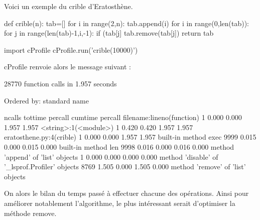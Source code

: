 \documentclass[11pt,oneside]{article}
\begin{document}
\begin{exemple}

Voici un exemple du crible d'Eratosthène.

\begin{py}
\begin{python}[H]
def crible(n):
    tab=[]
    for i in range(2,n):
        tab.append(i)
    for i in range(0,len(tab)):
        for j in range(len(tab)-1,i,-1):
            if (tab[j]%
                tab.remove(tab[j])
    return tab
    
import cProfile            
cProfile.run('crible(10000)')

\end{python}
\end{py}

\textsf{cProfile} renvoie alors le message suivant :

\begin{py}
\begin{python}[H]
 28770 function calls in 1.957 seconds

   Ordered by: standard name

   ncalls  tottime  percall  cumtime  percall filename:lineno(function)
        1    0.000    0.000    1.957    1.957 <string>:1(<module>)
        1    0.420    0.420    1.957    1.957 eratosthene.py:4(crible)
        1    0.000    0.000    1.957    1.957 {built-in method exec}
     9999    0.015    0.000    0.015    0.000 {built-in method len}
     9998    0.016    0.000    0.016    0.000 {method 'append' of 'list' objects}
        1    0.000    0.000    0.000    0.000 {method 'disable' of '_lsprof.Profiler' objects}
     8769    1.505    0.000    1.505    0.000 {method 'remove' of 'list' objects}

\end{python}
\end{py}

On alors le bilan du temps passé à effectuer chacune des opérations. Ainsi pour améliorer notablement l'algorithme, le plus intéressant serait d'optimiser la méthode \textsf{remove}.
\end{exemple}




\begin{thebibliography}{2}
\end{thebibliography}
\end{document}
